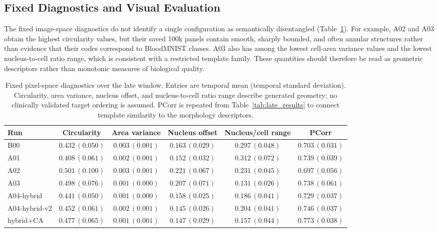 \subsection{Fixed Diagnostics and Visual Evaluation}

The fixed image-space diagnostics do not identify a single configuration as semantically disentangled (Table~\ref{tab:morphology_results}). For example, A02 and A03 obtain the highest circularity values, but their saved 100k panels contain smooth, sharply bounded, and often annular structures rather than evidence that their codes correspond to BloodMNIST classes. A03 also has among the lowest cell-area variance values and the lowest nucleus-to-cell ratio range, which is consistent with a restricted template family. These quantities should therefore be read as geometric descriptors rather than monotonic measures of biological quality.

\begin{table}[t]
\centering
\caption{Fixed pixel-space diagnostics over the late window. Entries are temporal mean (temporal standard deviation). Circularity, area variance, nucleus offset, and nucleus-to-cell ratio range describe generated geometry; no clinically validated target ordering is assumed. PCorr is repeated from Table~\ref{tab:late_results} to connect template similarity to the morphology descriptors.}
\label{tab:morphology_results}
\scriptsize
\setlength{\tabcolsep}{5pt}
\begin{tabular}{lccccc}
\toprule
Run & Circularity & Area variance & Nucleus offset & Nucleus/cell range & PCorr \\
\midrule
B00 & $0.432\,(0.050)$ & $0.003\,(0.001)$ & $0.163\,(0.029)$ & $0.297\,(0.048)$ & $0.703\,(0.031)$ \\
A01 & $0.408\,(0.061)$ & $0.002\,(0.001)$ & $0.152\,(0.032)$ & $0.312\,(0.072)$ & $0.739\,(0.039)$ \\
A02 & $0.501\,(0.100)$ & $0.003\,(0.001)$ & $0.221\,(0.067)$ & $0.231\,(0.045)$ & $0.697\,(0.056)$ \\
A03 & $0.498\,(0.076)$ & $0.001\,(0.000)$ & $0.207\,(0.071)$ & $0.131\,(0.026)$ & $0.738\,(0.061)$ \\
A04-hybrid & $0.441\,(0.050)$ & $0.001\,(0.000)$ & $0.158\,(0.025)$ & $0.186\,(0.041)$ & $0.729\,(0.037)$ \\
A04-hybrid-v2 & $0.452\,(0.061)$ & $0.002\,(0.001)$ & $0.145\,(0.026)$ & $0.204\,(0.041)$ & $0.746\,(0.037)$ \\
hybrid+CA & $0.477\,(0.065)$ & $0.001\,(0.001)$ & $0.147\,(0.029)$ & $0.157\,(0.044)$ & $0.773\,(0.038)$ \\
\bottomrule
\end{tabular}
\end{table}

